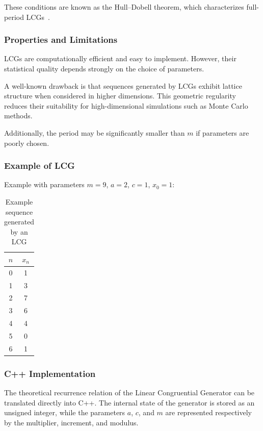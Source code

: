 These conditions are known as the Hull--Dobell theorem, which characterizes full-period LCGs~\cite{hull1962random}.

\subsubsection{Properties and Limitations}

LCGs are computationally efficient and easy to implement. However, their statistical quality depends strongly on the choice of parameters.

A well-known drawback is that sequences generated by LCGs exhibit lattice structure when considered in higher dimensions. This geometric regularity reduces their suitability for high-dimensional simulations such as Monte Carlo methods.

Additionally, the period may be significantly smaller than $m$ if parameters are poorly chosen.

\subsubsection{Example of LCG}

Example with parameters $m = 9$, $a = 2$, $c = 1$, $x_0 = 1$:

\begin{table}[htbp]
\centering
\small
\begin{tabular}{|c|c|}
\hline
$n$ & $x_n$ \\
\hline
0 & 1 \\
1 & 3 \\
2 & 7 \\
3 & 6 \\
4 & 4 \\
5 & 0 \\
6 & 1 \\
\hline
\end{tabular}
\caption{Example sequence generated by an LCG}
\end{table}

\subsubsection{C++ Implementation}

The theoretical recurrence relation of the Linear Congruential Generator can be translated directly into C++. The internal state of the generator is stored as an unsigned integer, while the parameters $a$, $c$, and $m$ are represented respectively by the multiplier, increment, and modulus.

